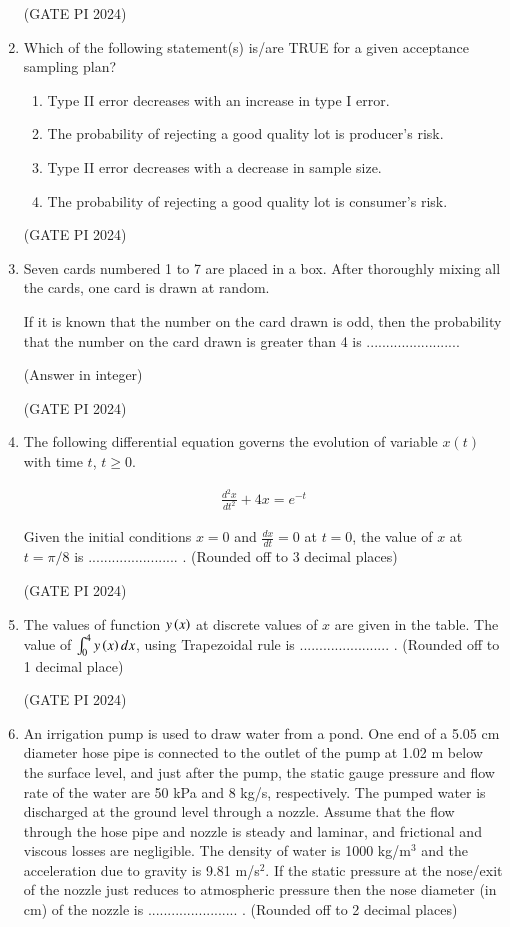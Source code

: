 \documentclass[journal,12pt,onecolumn]{IEEEtran}
\theoremstyle{remark}
\begin{document}
\begin{enumerate}
\hfill (GATE PI 2024)

\item Which of the following statement(s) is/are TRUE for a given acceptance sampling plan?

\begin{enumerate}
\item Type II error decreases with an increase in type I error.
\item The probability of rejecting a good quality lot is producer's risk.
\item Type II error decreases with a decrease in sample size.
\item The probability of rejecting a good quality lot is consumer's risk.
\end{enumerate}

\hfill (GATE PI 2024)

\item Seven cards numbered 1 to 7 are placed in a box. After thoroughly mixing all the cards, one card is drawn at random.

If it is known that the number on the card drawn is odd, then the probability that the number on the card drawn is greater than 4 is ........................

(Answer in integer)

\hfill (GATE PI 2024)

\item The following differential equation governs the evolution of variable $x(t)$ with time $t$, $t \geq 0$.

\begin{align*}
\frac{d^2x}{dt^2} + 4x = e^{-t}
\end{align*}

Given the initial conditions $x = 0$ and $\frac{dx}{dt} = 0$ at $t = 0$, the value of $x$ at $t = \pi/8$ is ....................... .
(Rounded off to 3 decimal places)

\hfill (GATE PI 2024)

\item The values of function $y\left(x\right)$ at discrete values of $x$ are given in the table. The value of $\int_0^4 y\left(x\right)dx$, using Trapezoidal rule is ....................... .
(Rounded off to 1 decimal place)



\hfill (GATE PI 2024)

\item An irrigation pump is used to draw water from a pond. One end of a 5.05 cm diameter hose pipe is connected to the outlet of the pump at 1.02 m below the surface level, and just after the pump, the static gauge pressure and flow rate of the water are 50 kPa and 8 kg/s, respectively. The pumped water is discharged at the ground level through a nozzle. Assume that the flow through the hose pipe and nozzle is steady and laminar, and frictional and viscous losses are negligible. The density of water is 1000 kg/m$^3$ and the acceleration due to gravity is 9.81 m/s$^2$. If the static pressure at the nose/exit of the nozzle just reduces to atmospheric pressure then the nose diameter (in cm) of the nozzle is ....................... . (Rounded off to 2 decimal places)


\end{enumerate}
\end{document}
